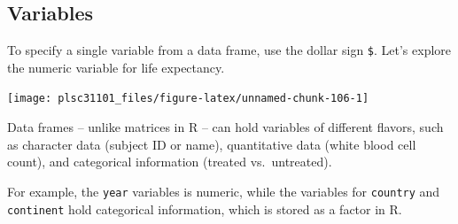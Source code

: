 \documentclass[]{book}
\newenvironment{Shaded}{\begin{snugshade}}{\end{snugshade}}
\newcommand{\KeywordTok}[1]{\textcolor[rgb]{0.13,0.29,0.53}{\textbf{#1}}}
\newcommand{\CommentTok}[1]{\textcolor[rgb]{0.56,0.35,0.01}{\textit{#1}}}
\newcommand{\OperatorTok}[1]{\textcolor[rgb]{0.81,0.36,0.00}{\textbf{#1}}}
\newcommand{\NormalTok}[1]{#1}
\begin{document}
\subsection{Variables}\label{variables-1}

To specify a single variable from a data frame, use the dollar sign
\texttt{\$}. Let's explore the numeric variable for life expectancy.

\begin{Shaded}
\end{Shaded}

\begin{center}\texttt{[image: plsc31101\_files/figure-latex/unnamed-chunk-106-1]} \end{center}

Data frames -- unlike matrices in R -- can hold variables of different
flavors, such as character data (subject ID or name), quantitative data
(white blood cell count), and categorical information (treated
vs.~untreated).

For example, the \texttt{year} variables is numeric, while the variables
for \texttt{country} and \texttt{continent} hold categorical
information, which is stored as a factor in R.
\end{document}

